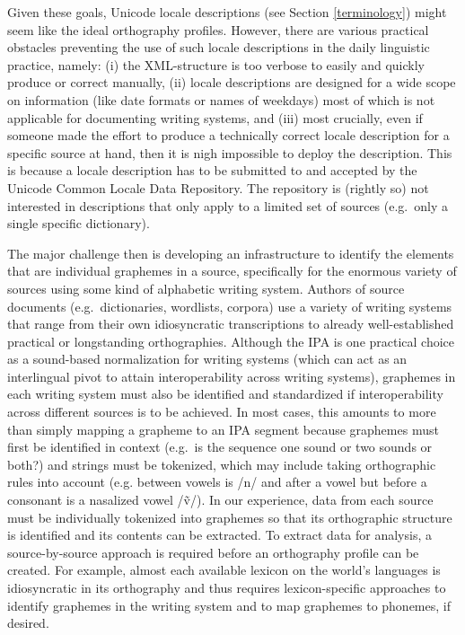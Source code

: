 Given these goals, Unicode locale descriptions (see Section \ref{terminology})
might seem like the ideal orthography profiles. However, there are various
practical obstacles preventing the use of such locale descriptions in the daily
linguistic practice, namely: (i) the XML-structure is too verbose to easily and
quickly produce or correct manually, (ii) locale descriptions are designed for a
wide scope on information (like date formats or names of weekdays) most of which
is not applicable for documenting writing systems, and (iii) most crucially,
even if someone made the effort to produce a technically correct locale
description for a specific source at hand, then it is nigh impossible to deploy
the description. This is because a locale description has to be submitted to and
accepted by the Unicode Common Locale Data Repository. The repository is
(rightly so) not interested in descriptions that only apply to a limited set of
sources (e.g.~only a single specific dictionary).

The major challenge then is developing an infrastructure to identify the
elements that are individual graphemes in a source, specifically for the
enormous variety of sources using some kind of alphabetic writing system.
Authors of source documents (e.g.~dictionaries, wordlists, corpora) use a
variety of writing systems that range from their own idiosyncratic
transcriptions to already well-established practical or longstanding
orthographies. Although the IPA is one practical choice as a sound-based
normalization for writing systems (which can act as an interlingual pivot to
attain interoperability across writing systems), graphemes in each writing
system must also be identified and standardized if interoperability across
different sources is to be achieved. In most cases, this amounts to more than
simply mapping a grapheme to an IPA segment because graphemes must first be
identified in context (e.g.~is the sequence one sound or two sounds or both?)
and strings must be tokenized, which may include taking orthographic rules into
account (e.g. between vowels is /n/ and after a vowel but before a consonant is
a nasalized vowel /ṽ/). In our experience, data from each source must be
individually tokenized into graphemes so that its orthographic structure is
identified and its contents can be extracted. To extract data for analysis, a
source-by-source approach is required before an orthography profile can be
created. For example, almost each available lexicon on the world's languages is
idiosyncratic in its orthography and thus requires lexicon-specific approaches
to identify graphemes in the writing system and to map graphemes to phonemes, if
desired.

